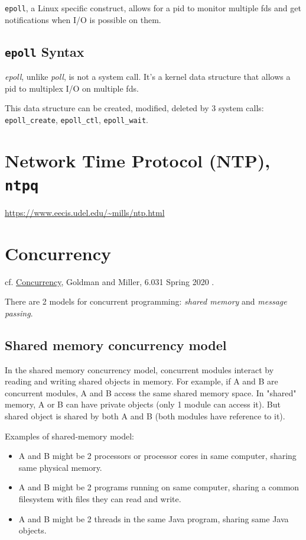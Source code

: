 \documentclass[10pt]{amsart}
\begin{document}
\texttt{epoll}, a Linux specific construct, allows for a pid to monitor multiple fds and get notifications when I/O is possible on them. 


\subsection{\texttt{epoll} Syntax}

\emph{epoll}, unlike \emph{poll}, is not a system call. It's a kernel data structure that allows a pid to multiplex I/O on multiple fds.

This data structure can be created, modified, deleted by 3 system calls: \texttt{epoll\_create}, \texttt{epoll\_ctl}, \texttt{epoll\_wait}.

\section{Network Time Protocol (NTP), \texttt{ntpq}}

\url{https://www.eecis.udel.edu/~mills/ntp.html}

\section{Concurrency}

cf. \href{http://web.mit.edu/6.031/www/sp20/classes/20-concurrency/}{Concurrency}, Goldman and Miller, 6.031 Spring 2020 \cite{6dot005and6dot031}. 

There are 2 models for concurrent programming: \emph{shared memory} and \emph{message passing}. 

\subsection{Shared memory concurrency model}

In the shared memory concurrency model, concurrent modules interact by reading and writing shared objects in memory. For example, if A and B are concurrent modules, A and B access the same shared memory space. In "shared" memory, A or B can have private objects (only 1 module can access it). But shared object is shared by both A and B (both modules have reference to it).

Examples of shared-memory model:
\begin{itemize}
	\item A and B might be 2 processors or processor cores in same computer, sharing same physical memory.
	\item A and B might be 2 programs running on same computer, sharing a common filesystem with files they can read and write.
	\item A and B might be 2 threads in the same Java program, sharing same Java objects.
\end{itemize}
\end{document}
